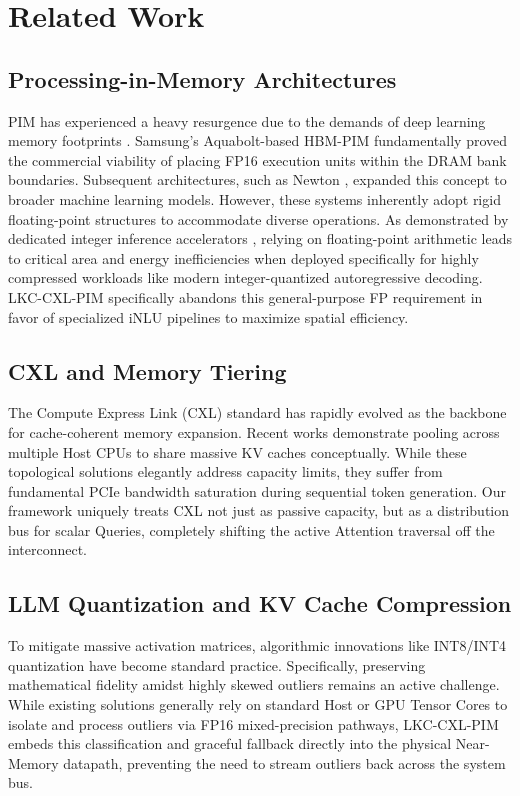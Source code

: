 \documentclass[10pt,conference]{IEEEtran}
\begin{document}
\section{Related Work}

\subsection{Processing-in-Memory Architectures}
PIM has experienced a heavy resurgence due to the demands of deep learning memory footprints \cite{pim_survey}. Samsung's Aquabolt-based HBM-PIM \cite{samsung_pim} fundamentally proved the commercial viability of placing FP16 execution units within the DRAM bank boundaries. Subsequent architectures, such as Newton \cite{newton_aim}, expanded this concept to broader machine learning models. However, these systems inherently adopt rigid floating-point structures to accommodate diverse operations. As demonstrated by dedicated integer inference accelerators \cite{pim_quant}, relying on floating-point arithmetic leads to critical area and energy inefficiencies when deployed specifically for highly compressed workloads like modern integer-quantized autoregressive decoding. LKC-CXL-PIM specifically abandons this general-purpose FP requirement in favor of specialized iNLU pipelines to maximize spatial efficiency.

\subsection{CXL and Memory Tiering}
The Compute Express Link (CXL) standard \cite{cxl_standard} has rapidly evolved as the backbone for cache-coherent memory expansion. Recent works \cite{cxl_pond} demonstrate pooling across multiple Host CPUs to share massive KV caches conceptually. While these topological solutions elegantly address capacity limits, they suffer from fundamental PCIe bandwidth saturation during sequential token generation. Our framework uniquely treats CXL not just as passive capacity, but as a distribution bus for scalar Queries, completely shifting the active Attention traversal off the interconnect. 

\subsection{LLM Quantization and KV Cache Compression}
To mitigate massive activation matrices, algorithmic innovations like INT8/INT4 quantization \cite{llm_int8, llm_smoothquant} have become standard practice. Specifically, preserving mathematical fidelity amidst highly skewed outliers \cite{llm_outliers} remains an active challenge. While existing solutions generally rely on standard Host or GPU Tensor Cores to isolate and process outliers via FP16 mixed-precision pathways, LKC-CXL-PIM embeds this classification and graceful fallback directly into the physical Near-Memory datapath, preventing the need to stream outliers back across the system bus.
\end{document}
